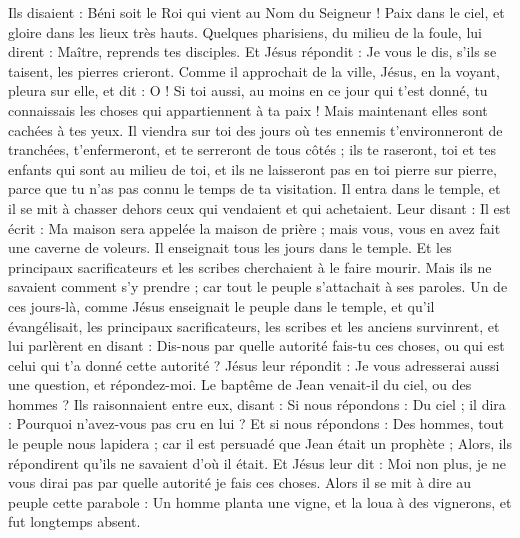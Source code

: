 \begin{multicols}{2}
{Ils disaient : Béni soit le Roi qui vient au Nom du Seigneur ! Paix dans le ciel, et gloire dans les lieux très hauts.
Quelques pharisiens, du milieu de la foule, lui dirent : Maître, reprends tes disciples.
Et Jésus répondit : Je vous le dis, s’ils se taisent, les pierres crieront.
Comme il approchait de la ville, Jésus, en la voyant, pleura sur elle, et dit :
O ! Si toi aussi, au moins en ce jour qui t’est donné, tu connaissais les choses qui appartiennent à ta paix ! Mais maintenant elles sont cachées à tes yeux.
Il viendra sur toi des jours où tes ennemis t'environneront de tranchées, t'enfermeront, et te serreront de tous côtés ;
ils te raseront, toi et tes enfants qui sont au milieu de toi, et ils ne laisseront pas en toi pierre sur pierre, parce que tu n'as pas connu le temps de ta visitation.
Il entra dans le temple, et il se mit à chasser dehors ceux qui vendaient et qui achetaient.
Leur disant : Il est écrit : Ma maison sera appelée la maison de prière ; mais vous, vous en avez fait une caverne de voleurs.
Il enseignait tous les jours dans le temple. Et les principaux sacrificateurs et les scribes cherchaient à le faire mourir.
Mais ils ne savaient comment s’y prendre ; car tout le peuple s’attachait à ses paroles.
\VerseOne{}Un de ces jours-là, comme Jésus enseignait le peuple dans le temple, et qu'il évangélisait, les principaux sacrificateurs, les scribes et les anciens survinrent,
et lui parlèrent en disant : Dis-nous par quelle autorité fais-tu ces choses, ou qui est celui qui t'a donné cette autorité ?
Jésus leur répondit : Je vous adresserai aussi une question, et répondez-moi.
Le baptême de Jean venait-il du ciel, ou des hommes ?
Ils raisonnaient entre eux, disant : Si nous répondons : Du ciel ; il dira : Pourquoi n’avez-vous pas cru en lui ?
Et si nous répondons : Des hommes, tout le peuple nous lapidera ; car il est persuadé que Jean était un prophète ;
Alors, ils répondirent qu'ils ne savaient d'où il était.
Et Jésus leur dit : Moi non plus, je ne vous dirai pas par quelle autorité je fais ces choses.
Alors il se mit à dire au peuple cette parabole : Un homme planta une vigne, et la loua à des vignerons, et fut longtemps absent.
}
\end{multicols}
